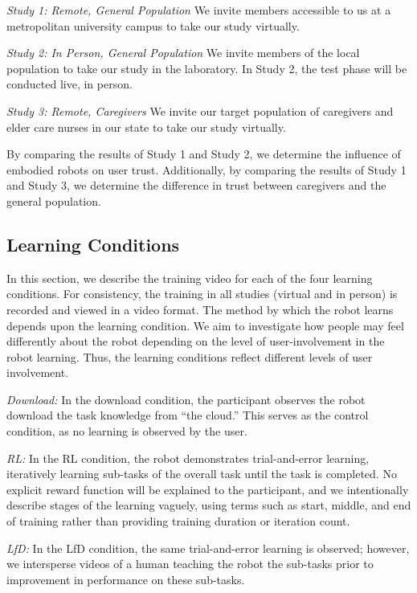 \documentclass[letterpaper]{article} %
\begin{document}
\indent \textit{Study 1: Remote, General Population} We invite members accessible to us at a metropolitan university campus to take our study virtually.

\indent \textit{Study 2: In Person, General Population} We invite members of the local population to take our study in the laboratory. In Study 2, the test phase will be conducted live, in person.

\indent \textit{Study 3: Remote, Caregivers} We invite our target population of caregivers and elder care nurses in our state to take our study virtually.

By comparing the results of Study 1 and Study 2, we determine the influence of embodied robots on user trust. Additionally, by comparing the results of Study 1 and Study 3, we determine the difference in trust between caregivers and the general population.

\subsection{Learning Conditions}
\label{sec:conditions}
In this section, we describe the training video for each of the four learning conditions. For consistency, the training in all studies (virtual and in person) is recorded and viewed in a video format. The method by which the robot learns depends upon the learning condition. We aim to investigate how people may feel differently about the robot depending on the level of user-involvement in the robot learning. Thus, the learning conditions reflect different levels of user involvement.

\textit{Download: }In the download condition, the participant observes the robot download the task knowledge from ``the cloud.'' This serves as the control condition, as no learning is observed by the user.

\textit{RL: }In the RL condition, the robot demonstrates trial-and-error learning, iteratively learning sub-tasks of the overall task until the task is completed. No explicit reward function will be explained to the participant, and we intentionally describe stages of the learning vaguely, using terms such as start, middle, and end of training rather than providing training duration or iteration count.

\textit{LfD: }In the LfD condition, the same trial-and-error learning is observed; however, we intersperse videos of a human teaching the robot the sub-tasks prior to improvement in performance on these sub-tasks.
\end{document}
